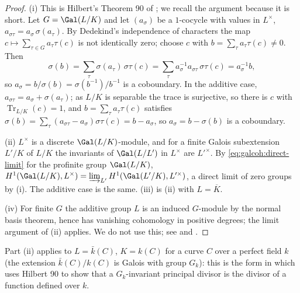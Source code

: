 \begin{proof}
(i) This is Hilbert's Theorem 90 of ; we recall the argument because it is short. Let $G=\Gal(L/K)$ and let $(a_\sigma)$ be a $1$-cocycle with
values in $L^\times$, $a_{\sigma\tau}=a_\sigma\,\sigma(a_\tau)$. By Dedekind's independence of characters the map $c\mapsto\sum_{\tau\in G}a_\tau\tau(c)$ is not
identically zero; choose $c$ with $b=\sum_\tau a_\tau\tau(c)\ne0$. Then
\[
\sigma(b)=\sum_\tau\sigma(a_\tau)\,\sigma\tau(c)=\sum_\tau a_\sigma^{-1}a_{\sigma\tau}\,\sigma\tau(c)=a_\sigma^{-1}b,
\]
so $a_\sigma=b/\sigma(b)=\sigma(b^{-1})/b^{-1}$ is a coboundary. In the additive case, $a_{\sigma\tau}=a_\sigma+\sigma(a_\tau)$; as $L/K$ is separable the trace is
surjective, so there is $c$ with $\operatorname{Tr}_{L/K}(c)=1$, and $b=\sum_\tau a_\tau\tau(c)$ satisfies $\sigma(b)=\sum_\tau(a_{\sigma\tau}-a_\sigma)\sigma\tau(c)=b-a_\sigma$, so
$a_\sigma=b-\sigma(b)$ is a coboundary.

(ii) $L^\times$ is a discrete $\Gal(L/K)$-module, and for a finite Galois subextension $L'/K$ of $L/K$ the invariants of $\Gal(L/L')$ in $L^\times$ are $L'^\times$. By
\eqref{eq:galcoh:direct-limit} for the profinite group $\Gal(L/K)$, $H^1(\Gal(L/K),L^\times)=\varinjlim_{L'}H^1(\Gal(L'/K),L'^\times)$, a direct limit of zero groups by
(i). The additive case is the same. (iii) is (ii) with $L=\overline K$.

(iv) For finite $G$ the additive group $L$ is an induced $G$-module by the normal basis theorem, hence has vanishing cohomology in positive degrees;
the limit argument of (ii) applies. We do not use this; see \cite[Chapter X, Section 1]{SerreLocalFields} and \cite[Chapter II, Section 1]{SerreGaloisCoh}.
\end{proof}

\begin{remark}
Part (ii) applies to $L=\bar k(C)$, $K=k(C)$ for a curve $C$ over a perfect field $k$ (the extension $\bar k(C)/k(C)$ is Galois with group $G_k$): this is the
form in which  uses Hilbert 90 to show that a $G_k$-invariant principal divisor is the divisor of a function defined over $k$.
\end{remark}


